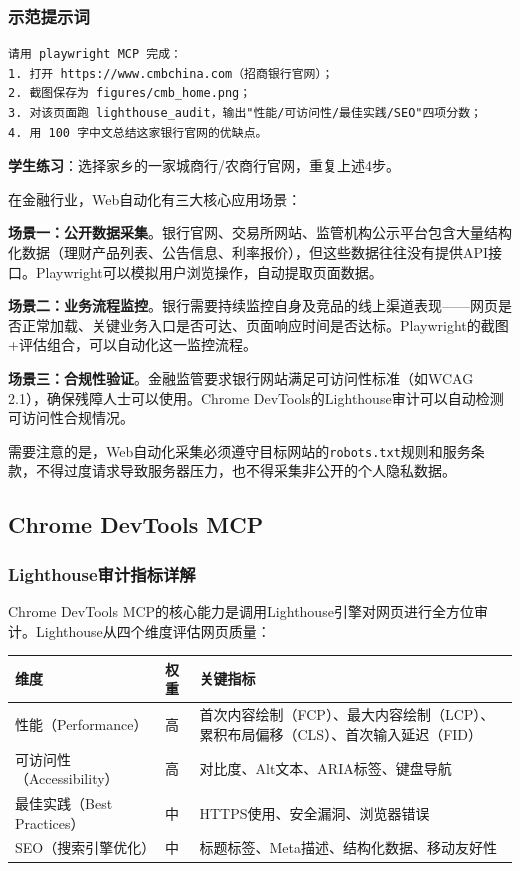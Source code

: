 \subsubsection{示范提示词}

\begin{lstlisting}
请用 playwright MCP 完成：
1. 打开 https://www.cmbchina.com（招商银行官网）；
2. 截图保存为 figures/cmb_home.png；
3. 对该页面跑 lighthouse_audit，输出"性能/可访问性/最佳实践/SEO"四项分数；
4. 用 100 字中文总结这家银行官网的优缺点。
\end{lstlisting}

\textbf{学生练习}：选择家乡的一家城商行/农商行官网，重复上述4步。

\begin{theorybox}[Web自动化在金融数据采集中的应用场景]
在金融行业，Web自动化有三大核心应用场景：

\textbf{场景一：公开数据采集}。银行官网、交易所网站、监管机构公示平台包含大量结构化数据（理财产品列表、公告信息、利率报价），但这些数据往往没有提供API接口。Playwright可以模拟用户浏览操作，自动提取页面数据。

\textbf{场景二：业务流程监控}。银行需要持续监控自身及竞品的线上渠道表现——网页是否正常加载、关键业务入口是否可达、页面响应时间是否达标。Playwright的截图+评估组合，可以自动化这一监控流程。

\textbf{场景三：合规性验证}。金融监管要求银行网站满足可访问性标准（如WCAG 2.1），确保残障人士可以使用。Chrome DevTools的Lighthouse审计可以自动检测可访问性合规情况。

需要注意的是，Web自动化采集必须遵守目标网站的\texttt{robots.txt}规则和服务条款，不得过度请求导致服务器压力，也不得采集非公开的个人隐私数据。
\end{theorybox}

\subsection{Chrome DevTools MCP}

\subsubsection{Lighthouse审计指标详解}

Chrome DevTools MCP的核心能力是调用Lighthouse引擎对网页进行全方位审计。Lighthouse从四个维度评估网页质量：

\begin{table}[H]
\centering
\begin{tabular}{lp{3cm}p{6cm}}
\toprule
\textbf{维度} & \textbf{权重} & \textbf{关键指标} \\
\midrule
性能（Performance） & 高 & 首次内容绘制（FCP）、最大内容绘制（LCP）、累积布局偏移（CLS）、首次输入延迟（FID） \\
可访问性（Accessibility） & 高 & 对比度、Alt文本、ARIA标签、键盘导航 \\
最佳实践（Best Practices） & 中 & HTTPS使用、安全漏洞、浏览器错误 \\
SEO（搜索引擎优化） & 中 & 标题标签、Meta描述、结构化数据、移动友好性 \\
\bottomrule
\end{tabular}
\end{table}

